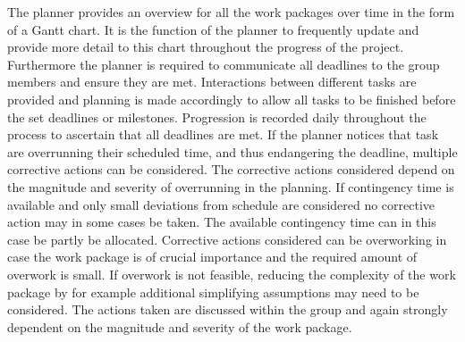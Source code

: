 The planner provides an overview for all the work packages over time in the form of a Gantt chart. It is the function of the planner to frequently update and provide more detail to this chart throughout the progress of the project. Furthermore the planner is required to communicate all deadlines to the group members and ensure they are met. Interactions between different tasks are provided and planning is made accordingly to allow all tasks to be finished before the set deadlines or milestones. Progression is recorded daily throughout the process to ascertain that all deadlines are met. If the planner notices that task are overrunning their scheduled time, and thus endangering the deadline, multiple corrective actions can be considered. The corrective actions considered depend on the magnitude and severity of overrunning in the planning. If contingency time is available and only small deviations from schedule are considered no corrective action may in some cases be taken. The available contingency time can in this case be partly be allocated. Corrective actions considered can be overworking in case the work package is of crucial importance and the required amount of overwork is small. If overwork is not feasible, reducing the complexity of the work package by for example additional simplifying assumptions may need to be considered. The actions taken are discussed within the group and again strongly dependent on the magnitude and severity of the work package.



